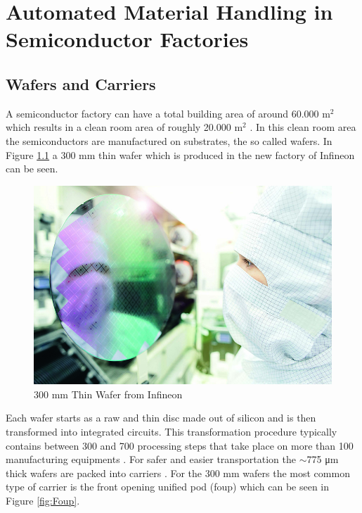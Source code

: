 %
%
%
%

\chapter{Automated Material Handling in Semiconductor Factories}
\label{cha:AMH}



\section{Wafers and Carriers}
\label{sec:WaferCarrier}

A semiconductor factory can have a total building area of around 60.000 m$^2$ which results in a clean room area of roughly 20.000 m$^2$ \cite{InfineonTechnologiesAG.17.07.2023}. In this clean room area the semiconductors are manufactured on substrates, the so called wafers. In Figure \ref{fig:300mmThinWafer} a 300 mm thin wafer which is produced in the new factory of Infineon can be seen.

\begin{figure}[h]
    \centering
    \includegraphics[scale=2.0]{pictures/Infineon-Chipfab-Thin-Wafer-300-mm-Villach.jpg}
    \caption{300 mm Thin Wafer from Infineon \cite{300mmThinWafer.17.09.2021}}
    \label{fig:300mmThinWafer}
\end{figure}

Each wafer starts as a raw and thin disc made out of silicon and is then transformed into integrated circuits. This transformation procedure typically contains between 300 and 700 processing steps that take place on more than 100 manufacturing equipments \cite{monch2012production}. For safer and easier transportation the $\sim$775 μm thick wafers are packed into carriers \cite{Wikipedia.2024}. For the 300 mm wafers the most common type of carrier is the front opening unified pod (\gls{foup}) which can be seen in Figure \ref{fig:Foup}.

